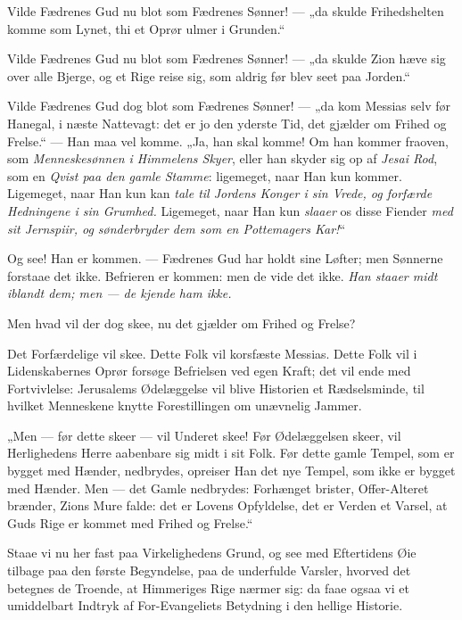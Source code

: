 \documentclass[12pt,a4paper]{book}
\begin{document}
Vilde Fædrenes Gud nu blot som Fædrenes Sønner! --- „da skulde Frihedshelten
komme som Lynet, thi et Oprør ulmer i Grunden.“

Vilde Fædrenes Gud nu blot som Fædrenes Sønner! --- „da skulde Zion hæve sig
over alle Bjerge, og et Rige reise sig, som aldrig før blev seet paa Jorden.“

Vilde Fædrenes Gud dog blot som Fædrenes Sønner! --- „da kom Messias selv før
Hanegal, i næste Nattevagt: det er jo den yderste Tid, det gjælder om Frihed og
Frelse.“ --- Han maa vel komme. „Ja, han skal komme! Om han kommer fraoven, som
\emph{Menneskesønnen i Himmelens Skyer}, eller han skyder sig op af \emph{Jesai
Rod}, som en \emph{Qvist paa den gamle Stamme}: ligemeget, naar Han kun kommer.
Ligemeget, naar Han kun kan \emph{tale til Jordens Konger i sin Vrede, og
forfærde Hedningene i sin Grumhed.} Ligemeget, naar Han kun \emph{slaaer} os
disse Fiender \emph{med sit Jernspiir, og sønderbryder dem som en Pottemagers
Kar!}“

Og see! Han er kommen. --- Fædrenes Gud har holdt sine
Løfter; men Sønnerne forstaae det ikke. Befrieren er kommen: men de vide det
ikke. \emph{Han staaer midt iblandt dem; men --- de kjende ham ikke.}

Men hvad vil der dog skee, nu det gjælder om Frihed og Frelse?

Det Forfærdelige vil skee. Dette Folk vil korsfæste Messias. Dette Folk vil i
Lidenskabernes Oprør forsøge Befrielsen ved egen Kraft; det vil ende med
Fortvivlelse: Jerusalems Ødelæggelse vil blive Historien et Rædselsminde, til
hvilket Menneskene knytte Forestillingen om unævnelig Jammer.

„Men --- før dette skeer --- vil Underet skee! Før Ødelæggelsen skeer, vil
Herlighedens Herre aabenbare sig midt i sit Folk. Før dette gamle Tempel, som er
bygget med Hænder, nedbrydes, opreiser Han det nye Tempel, som ikke er bygget
med Hænder. Men --- det Gamle nedbrydes: Forhænget brister, Offer-Alteret
brænder, Zions Mure falde: det er Lovens Opfyldelse, det er Verden et Varsel, at
Guds Rige er kommet med Frihed og Frelse.“

Staae vi nu her fast paa Virkelighedens Grund, og see med Eftertidens Øie
tilbage paa den første Begyndelse, paa de underfulde Varsler, hvorved det
betegnes de Troende, at Himmeriges Rige nærmer sig: da faae ogsaa vi et
umiddelbart Indtryk af For-Evangeliets Betydning i den hellige Historie.
\end{document}
